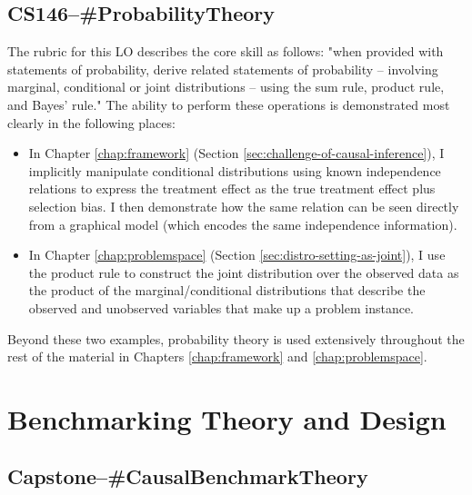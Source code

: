 \documentclass[../main.tex]{subfiles}
\begin{document}

\subsection*{\textbf{CS146--\#ProbabilityTheory}}
\label{lo:ProbabilityTheory}

The rubric for this LO describes the core skill as follows: "when provided with statements of probability, derive related statements of probability – involving marginal, conditional or joint distributions – using the sum rule, product rule, and Bayes' rule." The ability to perform these operations is demonstrated most clearly in the following places:

\begin{itemize}
    \item In Chapter \ref{chap:framework} (Section \ref{sec:challenge-of-causal-inference}), I implicitly manipulate conditional distributions using known independence relations to express the treatment effect as the true treatment effect plus selection bias. I then demonstrate how the same relation can be seen directly from a graphical model (which encodes the same independence information).
    
    \item In Chapter \ref{chap:problemspace} (Section \ref{sec:distro-setting-as-joint}), I use the product rule to construct the joint distribution over the observed data as the product of the marginal/conditional distributions that describe the observed and unobserved variables that make up a problem instance.
\end{itemize}

Beyond these two examples, probability theory is used extensively throughout the rest of the material in Chapters \ref{chap:framework} and \ref{chap:problemspace}.


\section{Benchmarking Theory and Design}

\subsection*{\textbf{Capstone--\#CausalBenchmarkTheory}}
\label{lo:CausalBenchmarkTheory}
\end{document}
